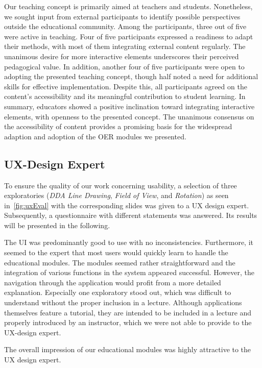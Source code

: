 Our teaching concept is primarily aimed at teachers and students. Nonetheless, we sought input from external participants to identify possible perspectives outside the educational community. Among the participants, three out of five were active in teaching. Four of five participants expressed a readiness to adapt their methods, with most of them integrating external content regularly. The unanimous desire for more interactive elements underscores their perceived pedagogical value.
In addition, another four of five participants were open to adopting the presented teaching concept, though half noted a need for additional skills for effective implementation. Despite this, all participants agreed on the content's accessibility and its meaningful contribution to student learning.
In summary, educators showed a positive inclination toward integrating interactive elements, with openness to the presented concept. The unanimous consensus on the accessibility of content provides a promising basis for the widespread adaption and adoption of the OER modules we presented.


\subsection{UX-Design Expert} %
To ensure the quality of our work concerning usability, a selection of three exploratories (\emph{DDA Line Drawing}, \emph{Field of View}, and \emph{Rotation}) as seen in~\autoref{fig:uxEval} with the corresponding slides was given to a UX design expert. Subsequently, a questionnaire with different statements was answered. Its results will be presented in the following.

The UI was predominantly good to use with no inconsistencies. Furthermore, it seemed to the expert that most users would quickly learn to handle the educational modules. The modules seemed rather straightforward and the integration of various functions in the system appeared successful. However, the navigation through the application would profit from a more detailed explanation. Especially one exploratory stood out, which was difficult to understand without the proper inclusion in a lecture. Although applications themselves feature a tutorial, they are intended to be included in a lecture and properly introduced by an instructor, which we were not able to provide to the UX-design expert. %

The overall impression of our educational modules was highly attractive to the UX design expert.

